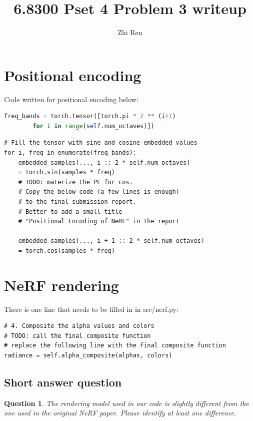 \documentclass[12pt]{article}
\newtheorem{question}{Question}
\begin{document}
\title{6.8300 Pset 4 Problem 3 writeup} %
\author{Zhi Ren} %
\maketitle
\section{Positional encoding}
Code written for positional encoding below:
\begin{lstlisting}[language=Python]
    freq_bands = torch.tensor([torch.pi * 2 ** (i+1) 
        for i in range(self.num_octaves)])
\end{lstlisting}


\begin{lstlisting}
# Fill the tensor with sine and cosine embedded values
for i, freq in enumerate(freq_bands):
    embedded_samples[..., i :: 2 * self.num_octaves] 
    = torch.sin(samples * freq)
    # TODO: materize the PE for cos.
    # Copy the below code (a few lines is enough) 
    # to the final submission report.
    # Better to add a small title 
    # "Positional Encoding of NeRF" in the report

    embedded_samples[..., i + 1 :: 2 * self.num_octaves] 
    = torch.cos(samples * freq)    
\end{lstlisting}

\section{NeRF rendering}
There is one line that needs to be filled in in src/nerf.py:
\begin{lstlisting}
# 4. Composite the alpha values and colors
# TODO: call the final composite function
# replace the following line with the final composite function
radiance = self.alpha_composite(alphas, colors)
\end{lstlisting}



\subsection{Short answer question}
\begin{question}
    The rendering model used in our code is slightly different from the one used in the original NeRF paper. Please identify at least one difference.
\end{question}
\end{document}
